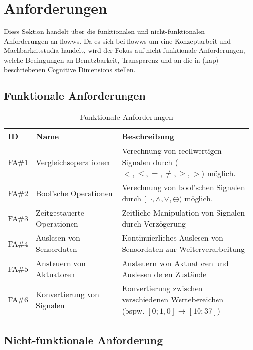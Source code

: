 \section{Anforderungen}
Diese Sektion handelt über die funktionalen und nicht-funktionalen Anforderungen an flowws. Da es sich bei flowws um eine Konzeptarbeit und Machbarkeitstudia handelt, wird der Fokus auf nicht-funktionale Anforderungen, welche Bedingungen an Benutzbarkeit, Transparenz und an die in (kap) beschriebenen Cognitive Dimensions stellen. 

\subsection{Funktionale Anforderungen}\label{subsec:fanf}
\begin{table}[H]
\caption{Funktionale Anforderungen}
\label{tab:fanf}
\begin{tabularx}{\textwidth}{llX}
\hline
\rowcolor[HTML]{EFEFEF}
ID    & Name                       & Beschreibung \\ \hline
FA\#1 & Vergleichsoperationen      & Verechnung von reellwertigen Signalen durch ($<,\leq,=,\neq,\geq,>$) möglich. \\ \hline
FA\#2 & Bool'sche Operationen      & Verechnung von bool'schen Signalen durch ($\neg, \land, \lor, \oplus$) möglich. \\ \hline
FA\#3 & Zeitgestauerte Operationen & Zeitliche Manipulation von Signalen durch Verzögerung \\ \hline
FA\#4 & Auslesen von Sensordaten   & Kontinuierliches Auslesen von Sensordaten zur Weiterverarbeitung \\ \hline
FA\#5 & Ansteuern von Aktuatoren   & Ansteuern von Aktuatoren und Auslesen deren Zustände \\ \hline
FA\#6 & Konvertierung von Signalen & Konvertierung zwischen verschiedenen Wertebereichen (bspw. $\left [ 0;1,0 \right ] \rightarrow \left [ 10;37 \right ]$) \\ \hline
\end{tabularx}
\end{table}

\subsection{Nicht-funktionale Anforderung}

